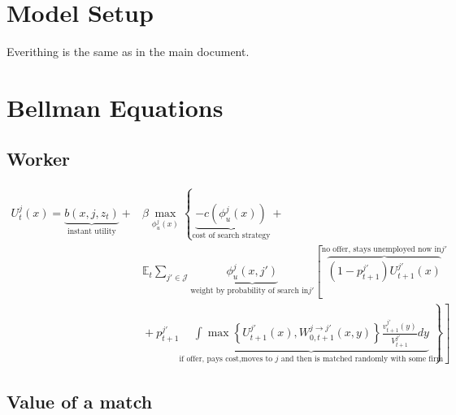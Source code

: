 \documentclass[
  letterpaper,
  DIV=11,
  numbers=noendperiod]{scrartcl}
\author{}
\date{}
\begin{document}
\ifdefined\Shaded\renewenvironment{Shaded}{\begin{tcolorbox}[enhanced, interior hidden, borderline west={3pt}{0pt}{shadecolor}, breakable, frame hidden, sharp corners, boxrule=0pt]}{\end{tcolorbox}}\fi

\hypertarget{model-setup}{%
\section{Model Setup}\label{model-setup}}

Everithing is the same as in the main document.

\hypertarget{bellman-equations}{%
\section{Bellman Equations}\label{bellman-equations}}

\hypertarget{worker}{%
\subsection{Worker}\label{worker}}

\begin{align*}
U^{j}_{t}(x) = \underbrace{b(x,j,z_t)}_{\text{instant utility}} + &\beta\max_{\phi^j_u(x)}\left\{ \underbrace{-c(\phi^j_u(x))}_{\text{cost of search strategy}} \right.  + \\
& \mathbb{E}_{t}\sum_{j'\in \mathcal{J}} \underbrace{\phi^j_u(x, j')}_{\text{weight by probability of search in} j'}\left[ \overbrace{(1-p^{j'}_{t+1})U^{j'}_{t+1}(x)}^{\text{no offer, stays unemployed now in} j'} \right.  \\
& \left. \left. \hspace{0cm} + p^{j'}_{t+1} \underbrace{\int \max\left\{U^{j'}_{t+1}(x),W^{j\to j'}_{0, t+1}(x,y)\right\}\frac{v^{j'}_{t+1}(y)}{V^{j'}_{t+1}}dy}_{\text{if offer, pays cost,moves to } j \text{ and then is matched randomly with some firm}} \right] \right\} 
\end{align*}

\hypertarget{value-of-a-match}{%
\subsection{Value of a match}\label{value-of-a-match}}
\end{document}
